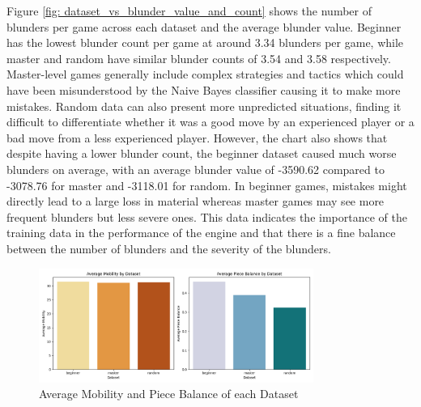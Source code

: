 Figure \ref{fig: dataset_vs_blunder_value_and_count} shows the number of blunders per game across each dataset and the average blunder value. Beginner has the lowest blunder count per game at around 3.34 blunders per game, while master and random have similar blunder counts of 3.54 and 3.58 respectively. Master-level games generally include complex strategies and tactics which could have been misunderstood by the Naive Bayes classifier causing it to make more mistakes. Random data can also present more unpredicted situations, finding it difficult to differentiate whether it was a good move by an experienced player or a bad move from a less experienced player. However, the chart also shows that despite having a lower blunder count, the beginner dataset caused much worse blunders on average, with an average blunder value of -3590.62 compared to -3078.76 for master and -3118.01 for random. In beginner games, mistakes might directly lead to a large loss in material whereas master games may see more frequent blunders but less severe ones. This data indicates the importance of the training data in the performance of the engine and that there is a fine balance between the number of blunders and the severity of the blunders.









\begin{figure}
    \centering
    \includegraphics[width=0.8\textwidth]{images/plots/dataset/Dataset_vs_mobility_and_piece_balance.png}
    \caption{Average Mobility and Piece Balance of each Dataset}
    \label{fig: dataset_vs_mobility_and_piece_balance}
\end{figure}

